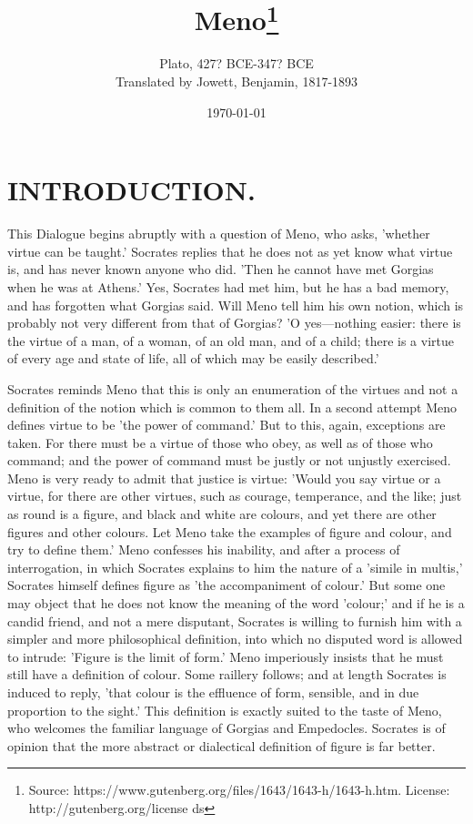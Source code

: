 \documentclass[11pt,letter]{article}
\begin{document}
\title{Meno\thanks{Source: https://www.gutenberg.org/files/1643/1643-h/1643-h.htm. License: http://gutenberg.org/license ds}}
\date{\today}
\author{Plato, 427? BCE-347? BCE\\ Translated by Jowett, Benjamin, 1817-1893}
\maketitle

\setcounter{tocdepth}{1}
\tableofcontents
\renewcommand{\baselinestretch}{1.0}
\normalsize
\newpage

\section{
      INTRODUCTION.
    }
\par  This Dialogue begins abruptly with a question of Meno, who asks, 'whether virtue can be taught.' Socrates replies that he does not as yet know what virtue is, and has never known anyone who did. 'Then he cannot have met Gorgias when he was at Athens.' Yes, Socrates had met him, but he has a bad memory, and has forgotten what Gorgias said. Will Meno tell him his own notion, which is probably not very different from that of Gorgias? 'O yes—nothing easier: there is the virtue of a man, of a woman, of an old man, and of a child; there is a virtue of every age and state of life, all of which may be easily described.'

\par  Socrates reminds Meno that this is only an enumeration of the virtues and not a definition of the notion which is common to them all. In a second attempt Meno defines virtue to be 'the power of command.' But to this, again, exceptions are taken. For there must be a virtue of those who obey, as well as of those who command; and the power of command must be justly or not unjustly exercised. Meno is very ready to admit that justice is virtue: 'Would you say virtue or a virtue, for there are other virtues, such as courage, temperance, and the like; just as round is a figure, and black and white are colours, and yet there are other figures and other colours. Let Meno take the examples of figure and colour, and try to define them.' Meno confesses his inability, and after a process of interrogation, in which Socrates explains to him the nature of a 'simile in multis,' Socrates himself defines figure as 'the accompaniment of colour.' But some one may object that he does not know the meaning of the word 'colour;' and if he is a candid friend, and not a mere disputant, Socrates is willing to furnish him with a simpler and more philosophical definition, into which no disputed word is allowed to intrude: 'Figure is the limit of form.' Meno imperiously insists that he must still have a definition of colour. Some raillery follows; and at length Socrates is induced to reply, 'that colour is the effluence of form, sensible, and in due proportion to the sight.' This definition is exactly suited to the taste of Meno, who welcomes the familiar language of Gorgias and Empedocles. Socrates is of opinion that the more abstract or dialectical definition of figure is far better.
\end{document}
